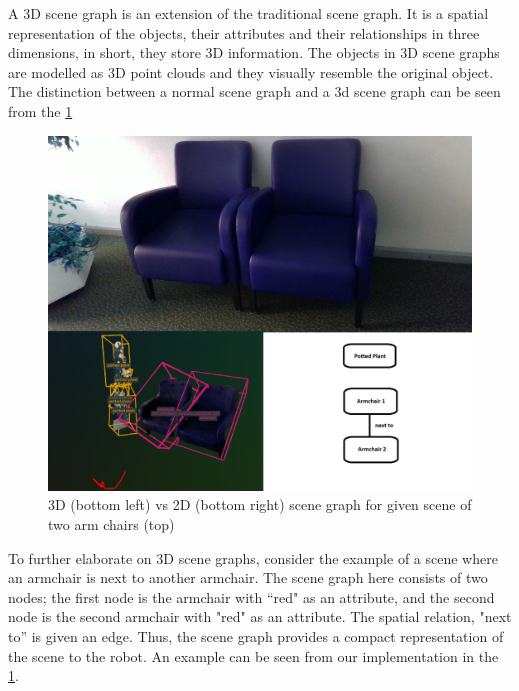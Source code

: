 A 3D scene graph is an extension of the traditional scene graph. It is a spatial representation of the objects, their attributes 
and their relationships in three dimensions, in short, they store 3D information. The objects in 3D scene graphs are modelled as
 3D point clouds and they visually resemble the original object. The distinction between a normal scene graph and a 3d scene graph 
 can be seen from the \cref{fig:2dvs3dSG}
 \begin{figure}[ht!]
    \centering
    \includegraphics[width=\textwidth]{content/images/2dvs3dSG.png}
    \caption{3D (bottom left) vs 2D (bottom right) scene graph for given scene of two arm chairs (top)}
    \label{fig:2dvs3dSG}
\end{figure}
To further elaborate on 3D scene graphs, consider the example of a scene where an armchair is next to another armchair.
The scene graph here consists of two nodes;
the first node is the armchair with “red" as an attribute, and the second node is the second armchair with "red" as an attribute. The spatial relation, 
"next to” is given an edge. Thus, the scene graph provides a compact representation of the scene to the robot. 
An example can be seen from our implementation in the \cref{fig:2dvs3dSG}.

